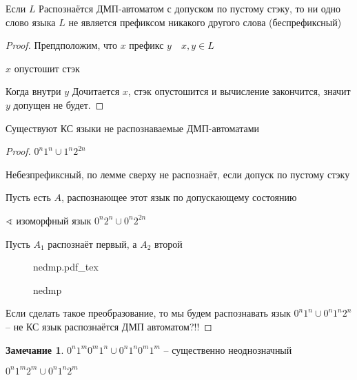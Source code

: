 \documentclass{book}
\theoremstyle{definition}
\newtheorem*{note}{Замечание}
\newcommand{\incfig}[1]{%
    \def\svgwidth{\columnwidth}
    {#1.pdf_tex}
}
\begin{document}
\begin{lemma}
    Если $L$ Распознаётся ДМП-автоматом с допуском по пустому стэку, то ни одно слово языка  $L$ не является префиксом никакого другого слова (беспрефиксный)
\end{lemma}
\begin{proof}
    Препдположим, что $x$ префикс  $y\quad x, y\in L$

     $x$ опустошит стэк

     Когда внутри  $y$ Дочитается  $x$, стэк опустошится и вычисление закончится, значит  $y$ допущен не будет.
\end{proof}

\begin{statement}
    Существуют КС языки не распознаваемые ДМП-автоматами
\end{statement}
\begin{proof}
    $0^n 1^n \cup 1^n 2^{2n}$

    Небезпрефиксный, по лемме сверху не распознаёт, если допуск по пустому стэку

    Пусть есть $A$, распознающее этот язык по допускающему состоянию

    $\sphericalangle $ изоморфный язык $0^n 2^n \cup 0^n 2^{2n}$

    Пусть $A_1$ распознаёт первый, а $A_2$ второй

\begin{figure}[!ht]
    \centering
    \incfig{nedmp}
    \caption{nedmp}
    \label{fig:nedmp}
\end{figure}


Если сделать такое преобразование, то мы будем распознавать язык $0^n 1^n \cup  0^n 1^n 2^n$ -- не КС язык распознаётся ДМП автоматом?!!
\end{proof}

\begin{note}
    $0^n1^m0^m1^n \cup 0^n1^n0^m1^m$ -- существенно неоднозначный

    $0^n 1^m 2^m \cup  0^n 1^n 2^m$
\end{note}
\end{document}
